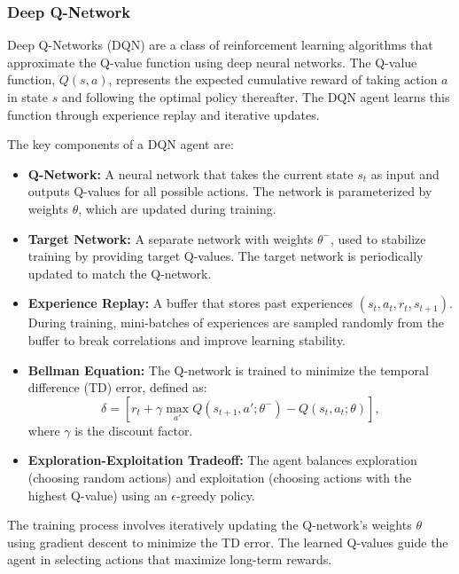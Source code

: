 \documentclass[runningheads]{llncs}
\begin{document}
\subsubsection{Deep Q-Network}
Deep Q-Networks (DQN) are a class of reinforcement learning algorithms that approximate the Q-value function using deep neural networks. The Q-value function, $Q(s, a)$, represents the expected cumulative reward of taking action $a$ in state $s$ and following the optimal policy thereafter. The DQN agent learns this function through experience replay and iterative updates.

The key components of a DQN agent are:

\begin{itemize}
    \item \textbf{Q-Network:} A neural network that takes the current state $s_t$ as input and outputs Q-values for all possible actions. The network is parameterized by weights $\theta$, which are updated during training.
    \item \textbf{Target Network:} A separate network with weights $\theta^-$, used to stabilize training by providing target Q-values. The target network is periodically updated to match the Q-network.
    \item \textbf{Experience Replay:} A buffer that stores past experiences $(s_t, a_t, r_t, s_{t+1})$. During training, mini-batches of experiences are sampled randomly from the buffer to break correlations and improve learning stability.
    \item \textbf{Bellman Equation:} The Q-network is trained to minimize the temporal difference (TD) error, defined as:
    \[
    \delta = \left[ r_t + \gamma \max_{a'} Q(s_{t+1}, a'; \theta^-) - Q(s_t, a_t; \theta) \right],
    \]
    where $\gamma$ is the discount factor.
    \item \textbf{Exploration-Exploitation Tradeoff:} The agent balances exploration (choosing random actions) and exploitation (choosing actions with the highest Q-value) using an $\epsilon$-greedy policy.
\end{itemize}

The training process involves iteratively updating the Q-network's weights $\theta$ using gradient descent to minimize the TD error. The learned Q-values guide the agent in selecting actions that maximize long-term rewards.
\end{document}
